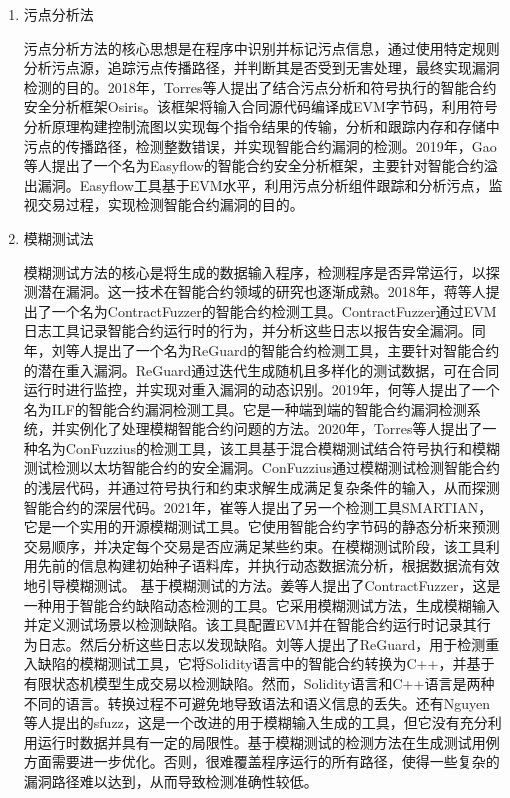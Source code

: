 \begin{enumerate}[label=\textbf{\textit{\Alph*.}}, align=left]
    \item 污点分析法
    
    污点分析方法的核心思想是在程序中识别并标记污点信息，通过使用特定规则分析污点源，追踪污点传播路径，并判断其是否受到无害处理，最终实现漏洞检测的目的。2018年，Torres等人提出了结合污点分析和符号执行的智能合约安全分析框架Osiris。该框架将输入合同源代码编译成EVM字节码，利用符号分析原理构建控制流图以实现每个指令结果的传输，分析和跟踪内存和存储中污点的传播路径，检测整数错误，并实现智能合约漏洞的检测。2019年，Gao等人提出了一个名为Easyflow的智能合约安全分析框架，主要针对智能合约溢出漏洞。Easyflow工具基于EVM水平，利用污点分析组件跟踪和分析污点，监视交易过程，实现检测智能合约漏洞的目的。
    
    \item 模糊测试法
    
    模糊测试方法的核心是将生成的数据输入程序，检测程序是否异常运行，以探测潜在漏洞。这一技术在智能合约领域的研究也逐渐成熟。2018年，蒋等人提出了一个名为ContractFuzzer的智能合约检测工具。ContractFuzzer通过EVM日志工具记录智能合约运行时的行为，并分析这些日志以报告安全漏洞。同年，刘等人提出了一个名为ReGuard的智能合约检测工具，主要针对智能合约的潜在重入漏洞。ReGuard通过迭代生成随机且多样化的测试数据，可在合同运行时进行监控，并实现对重入漏洞的动态识别。2019年，何等人提出了一个名为ILF的智能合约漏洞检测工具。它是一种端到端的智能合约漏洞检测系统，并实例化了处理模糊智能合约问题的方法。2020年，Torres等人提出了一种名为ConFuzzius的检测工具，该工具基于混合模糊测试结合符号执行和模糊测试检测以太坊智能合约的安全漏洞。ConFuzzius通过模糊测试检测智能合约的浅层代码，并通过符号执行和约束求解生成满足复杂条件的输入，从而探测智能合约的深层代码。2021年，崔等人提出了另一个检测工具SMARTIAN，它是一个实用的开源模糊测试工具。它使用智能合约字节码的静态分析来预测交易顺序，并决定每个交易是否应满足某些约束。在模糊测试阶段，该工具利用先前的信息构建初始种子语料库，并执行动态数据流分析，根据数据流有效地引导模糊测试。
    基于模糊测试的方法。姜等人提出了ContractFuzzer，这是一种用于智能合约缺陷动态检测的工具。它采用模糊测试方法，生成模糊输入并定义测试场景以检测缺陷。该工具配置EVM并在智能合约运行时记录其行为日志。然后分析这些日志以发现缺陷。刘等人提出了ReGuard，用于检测重入缺陷的模糊测试工具，它将Solidity语言中的智能合约转换为C++，并基于有限状态机模型生成交易以检测缺陷。然而，Solidity语言和C++语言是两种不同的语言。转换过程不可避免地导致语法和语义信息的丢失。还有Nguyen等人提出的sfuzz，这是一个改进的用于模糊输入生成的工具，但它没有充分利用运行时数据并具有一定的局限性。基于模糊测试的检测方法在生成测试用例方面需要进一步优化。否则，很难覆盖程序运行的所有路径，使得一些复杂的漏洞路径难以达到，从而导致检测准确性较低。


\end{enumerate}
